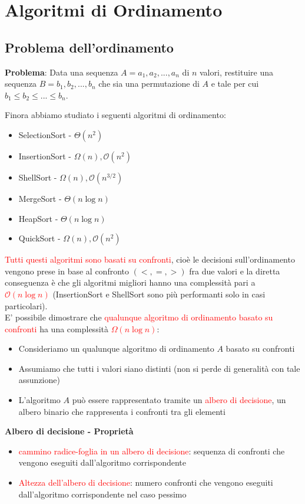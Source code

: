 \documentclass[../cheatSheetAlgoritmi.tex]{subfiles}
\begin{document}
\section{Algoritmi di Ordinamento}
\subsection{Problema dell'ordinamento}
\textbf{Problema}: Data una sequenza $A = a_1, a_2 , ..., a_n$ di $n$ valori, restituire una sequenza $B = b_1 , b_2 , ..., b_n$ che sia una permutazione di $A$ e tale per cui $b_1 \leq b_2 \leq ... \leq b_n$.

Finora abbiamo studiato i seguenti algoritmi di ordinamento:

\begin{itemize}
	\item SelectionSort - $\Theta(n^{2})$
	\item InsertionSort - $\Omega(n), \mathcal{O}(n^{2})$
	\item ShellSort - $\Omega(n), \mathcal{O}(n^{3/2})$
	\item MergeSort - $\Theta(n \log n)$
	\item HeapSort - $\Theta(n \log n)$
	\item QuickSort - $\Omega(n), \mathcal{O}(n^{2})$
\end{itemize} 
\textcolor{red}{Tutti questi algoritmi sono basati su confronti}, cioè le decisioni sull'ordinamento vengono prese in base al confronto $(<, =, >)$ fra due valori e la diretta conseguenza è che gli algoritmi migliori hanno una complessità pari a \textcolor{red}{$\mathcal{O}(n \log n)$} (InsertionSort e ShellSort sono più performanti solo in casi particolari).\\
E' possibile dimostrare che \textcolor{red}{qualunque algoritmo di ordinamento basato su confronti} ha una complessità \textcolor{red}{$\Omega(n \log n)$}:
\begin{itemize}
	\item Consideriamo un qualunque algoritmo di ordinamento $A$ basato su confronti
	\item Assumiamo che tutti i valori siano distinti (non si perde di generalità con tale assunzione)
	\item L'algoritmo $A$ può essere rappresentato tramite un \textcolor{red}{albero di decisione}, un albero binario che rappresenta i confronti tra gli elementi
\end{itemize}
\textbf{Albero di decisione - Proprietà}
\begin{itemize}
	\item \textcolor{red}{cammino radice-foglia in un albero di decisione}: sequenza di confronti che vengono eseguiti dall'algoritmo corrispondente
	\item \textcolor{red}{Altezza dell'albero di decisione}: numero confronti che vengono eseguiti dall'algoritmo corrispondente nel caso pessimo
\end{itemize}
\end{document}
